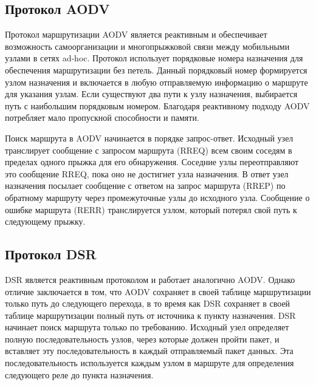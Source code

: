 \subsection*{Протокол AODV}

Протокол маршрутизации AODV является реактивным и обеспечивает возможность самоорганизации и многопрыжковой связи между мобильными узлами в сетях ad-hoc. Протокол использует порядковые номера назначения для обеспечения маршрутизации без петель. Данный порядковый номер формируется узлом назначения и включается в любую отправляемую информацию о маршруте для указания узлам. Если существуют два пути к узлу назначения, выбирается путь с наибольшим порядковым номером. Благодаря реактивному подходу AODV потребляет мало пропускной способности и памяти.~\cite{pande2021performance}

Поиск маршрута в AODV начинается в порядке запрос-ответ. Исходный узел транслирует сообщение с запросом маршрута (RREQ) всем своим соседям в пределах одного прыжка для его обнаружения. Соседние узлы переотправляют это сообщение RREQ, пока оно не достигнет узла назначения. В ответ узел назначения посылает сообщение с ответом на запрос маршрута (RREP) по обратному маршруту через промежуточные узлы до исходного узла. Сообщение о ошибке маршрута (RERR) транслируется узлом, который потерял свой путь к следующему прыжку.

\subsection*{Протокол DSR}

DSR является реактивным протоколом и работает аналогично AODV. Однако отличие заключается в том, что AODV сохраняет в своей таблице маршрутизации только путь до следующего перехода, в то время как DSR сохраняет в своей таблице маршрутизации полный путь от источника к пункту назначения. DSR начинает поиск маршрута только по требованию. Исходный узел определяет полную последовательность узлов, через которые должен пройти пакет, и вставляет эту последовательность в каждый отправляемый пакет данных. Эта последовательность используется каждым узлом в маршруте для определения следующего реле до пункта назначения.
